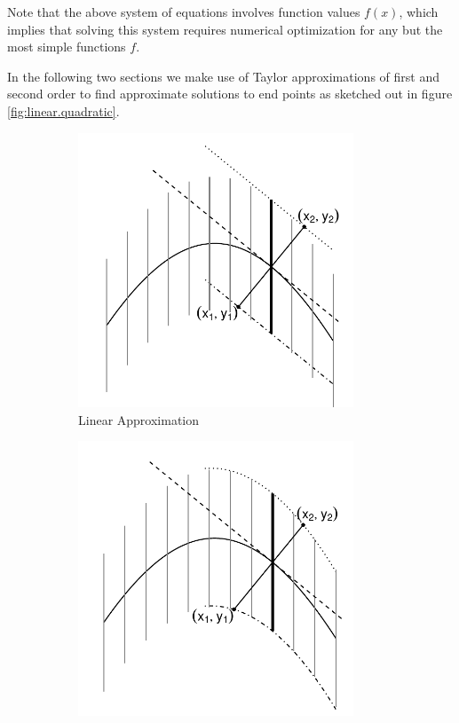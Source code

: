 \documentclass[11pt]{isuthesis}\usepackage[]{graphicx}\usepackage[]{color}
\begin{document}
Note that  the above system of equations involves function values $f(x)$, which implies that solving this system  requires numerical optimization for any but the most simple functions $f$.

In the following two sections we make use of Taylor approximations of first and second order to find approximate solutions to end points as sketched out in figure \ref{fig:linear.quadratic}.




\begin{figure}[h!]\centering
\begin{subfigure}[t]{0.4\textwidth}\centering
\includegraphics[keepaspectratio=TRUE,width=0.9\textwidth]{fig-generalcorrectioncartoon2}
\caption{Linear Approximation}\label{fig:linear-GeneralCorrection}
\end{subfigure}
\begin{subfigure}[t]{0.4\textwidth}\centering
\includegraphics[keepaspectratio=TRUE,width=0.9\textwidth]{fig-generalcorrectioncartoon3}

\end{subfigure}
\end{figure}
\end{document}
